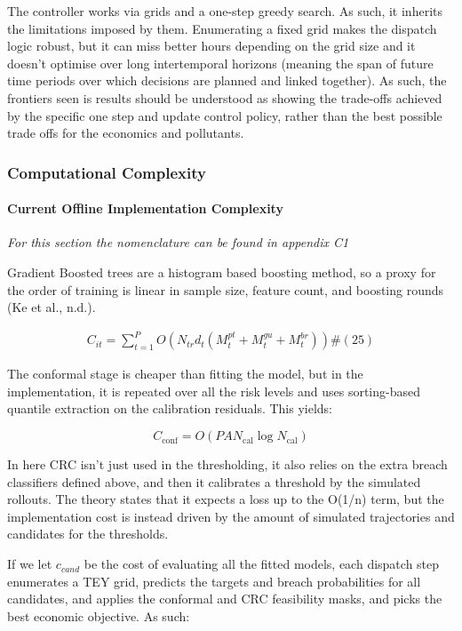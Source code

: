 \documentclass[11pt]{article}
\begin{document}
The controller works via grids and a one-step greedy search. As such, it
inherits the limitations imposed by them. Enumerating a fixed grid makes
the dispatch logic robust, but it can miss better hours depending on the
grid size and it doesn't optimise over long intertemporal horizons
(meaning the span of future time periods over which decisions are
planned and linked together). As such, the frontiers seen is results
should be understood as showing the trade-offs achieved by the specific
one step and update control policy, rather than the best possible trade
offs for the economics and pollutants.

\subsubsection{Computational Complexity}\label{computational-complexity}

\paragraph{Current Offline Implementation
Complexity}\label{current-offline-implementation-complexity}

\emph{For this section the nomenclature can be found in appendix C1}

Gradient Boosted trees are a histogram based boosting method, so a proxy
for the order of training is linear in sample size, feature count, and
boosting rounds (Ke et al., n.d.).

\[\begin{array}{r}
C_{it} = \sum_{t = 1}^{P}{O\left( N_{tr}d_{t}\left( M_{t}^{pt} + M_{t}^{gu} + M_{t}^{br} \right) \right)}\#(25)
\end{array}\]

The conformal stage is cheaper than fitting the model, but in the
implementation, it is repeated over all the risk levels and uses
sorting-based quantile extraction on the calibration residuals. This
yields:

\[C_{\text{conf}} = O\left( PAN_{\text{cal}}\log N_{\text{cal}} \right)\]

In here CRC isn't just used in the thresholding, it also relies on the
extra breach classifiers defined above, and then it calibrates a
threshold by the simulated rollouts. The theory states that it expects a
loss up to the O(1/n) term, but the implementation cost is instead
driven by the amount of simulated trajectories and candidates for the
thresholds.

If we let \(c_{cand}\) be the cost of evaluating all the fitted models,
each dispatch step enumerates a TEY grid, predicts the targets and
breach probabilities for all candidates, and applies the conformal and
CRC feasibility masks, and picks the best economic objective. As such:
\end{document}
